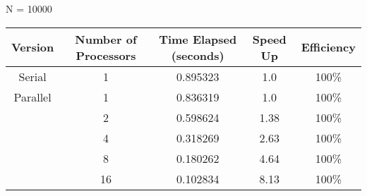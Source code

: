 \documentclass[11pt]{article}
\begin{document}
    N = 10000
    \begin{tabular}{|c|c|c|c|c|}
        \hline
        Version & Number of Processors & Time Elapsed (seconds) & Speed Up & Efficiency \\
        \hline
        Serial & 1 & 0.895323 & 1.0 & 100\% \\
        \hline
        Parallel & 1 & 0.836319 & 1.0 & 100\% \\
                 & 2 & 0.598624 & 1.38 & 100\% \\
                 & 4 & 0.318269 & 2.63 & 100\% \\
                 & 8 & 0.180262 & 4.64 & 100\% \\
                 & 16 & 0.102834 & 8.13 & 100\%
        \hline
    \end{tabular}
\end{document}
